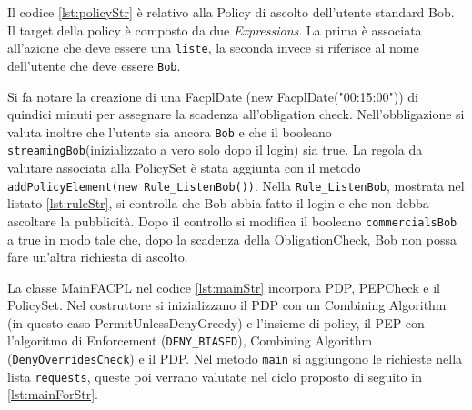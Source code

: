 Il codice \ref{lst:policyStr} è relativo alla Policy di ascolto dell'utente standard Bob.
Il target della policy è composto da due \emph{Expressions}. La prima è associata all'azione che deve essere una \texttt{liste},
la seconda invece si riferisce al nome dell'utente che deve essere \texttt{Bob}.\par
Si fa notare la creazione di una FacplDate (new FacplDate("00:15:00")) di quindici minuti per assegnare la scadenza all'obligation check.
Nell'obbligazione si valuta inoltre che l'utente sia ancora \texttt{Bob} e che il booleano
\texttt{streamingBob}(inizializzato a vero solo dopo il login) sia true.
La regola da valutare associata alla PolicySet è stata aggiunta con il metodo
\texttt{addPolicyElement(new Rule\_ListenBob())}.
Nella \texttt{Rule\_ListenBob}, mostrata nel listato \ref{lst:ruleStr}, si controlla che Bob abbia fatto il login e che
non debba ascoltare la pubblicità. Dopo il controllo si modifica il booleano \texttt{commercialsBob} a true in modo tale
che, dopo la scadenza della ObligationCheck, Bob non possa fare un'altra richiesta di ascolto.

La classe MainFACPL nel codice \ref{lst:mainStr} incorpora PDP, PEPCheck e il PolicySet. Nel costruttore si inizializzano
il PDP con un Combining Algorithm (in questo caso PermitUnlessDenyGreedy) e l'insieme di policy, il PEP con l'algoritmo di
Enforcement (\texttt{DENY\_BIASED}), Combining Algorithm (\texttt{DenyOverridesCheck}) e il PDP.
Nel metodo \texttt{main} si aggiungono le richieste nella lista \texttt{requests}, queste poi verrano
valutate nel ciclo proposto di seguito in \ref{lst:mainForStr}.

